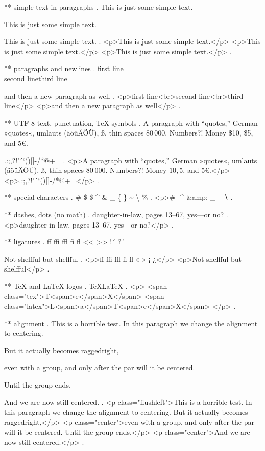 ** simple text in paragraphs
.
This is just some simple text.

This is just some simple text.

This is just some simple text.
.
<p>This is just some simple text.</p>
<p>This is just some simple text.</p>
<p>This is just some simple text.</p>
.

** paragraphs and newlines
.
first line\\second line\newline third line\par and then a new paragraph as well
.
<p>ﬁrst line<br>second line<br>third line</p>
<p>and then a new paragraph as well</p>
.


** UTF-8 text, punctuation, TeX symbols
.
A para\-graph with “quotes,” German »quotes«, umlauts (äöüÄÖÜ), ß, thin spaces 80\,000. Numbers?! Money \$10, \$5, and 5€.

.:;,?!'´`()[]-/*@+=
.
<p>A paragraph with “quotes,” German »quotes«, umlauts (äöüÄÖÜ), ß, thin spaces 80 000. Numbers?! Money $10, $5, and 5€.</p>
<p>.:;,?!'´`()[]‐/*@+=</p>
.


** special characters
.
\# \$ \$ \^{} \& \_ \{ \} \~{} \textbackslash{} \%
.
<p># $ $ ^​ &amp; _ { } ~​ ∖​ %
.


** dashes, dots (no math)
.
daughter-in-law, pages 13--67, yes---or no?
.
<p>daughter‐in‐law, pages 13–67, yes—or no?</p>
.


** ligatures
.
ff ffi ffl fi fl << >> !´ ?´

Not shelfful but shelf\mbox{}ful
.
<p>ﬀ ﬃ ﬄ ﬁ ﬂ « » ¡ ¿</p>
<p>Not shelﬀul but shelfful</p>
.


** TeX and LaTeX logos
.
\TeX \LaTeX
.
<p>
<span class="tex">T<span>e</span>X</span>
<span class="latex">L<span>a</span>T<span>e</span>X</span>
</p>
.


** alignment
.
This is a horrible test.
\centering
In this paragraph we change the alignment to centering.
{\raggedright But it actually becomes raggedright,

even with a group, and only after the par will it be centered.}
Until the group ends.

And we are now still centered.
.
<p class="flushleft">This is a horrible test. In this paragraph we change the alignment to centering. But it actually becomes raggedright,</p>
<p class="center">even with a group, and only after the par will it be centered.​ Until the group ends.</p>
<p class="center">And we are now still centered.</p>
.
